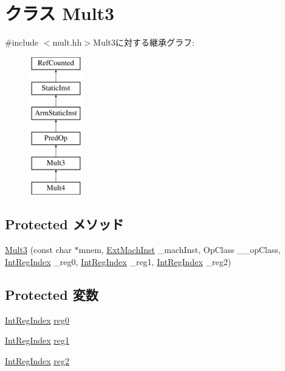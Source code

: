\hypertarget{classArmISA_1_1Mult3}{
\section{クラス Mult3}
\label{classArmISA_1_1Mult3}
}


{\ttfamily \#include $<$mult.hh$>$}Mult3に対する継承グラフ:\begin{figure}[H]
\begin{center}
\leavevmode
\includegraphics[height=6cm]{classArmISA_1_1Mult3}
\end{center}
\end{figure}
\subsection*{Protected メソッド}
\begin{DoxyCompactItemize}
\item 
\hyperlink{classArmISA_1_1Mult3_aca7558e284e8d9be43dd576b00d43e36}{Mult3} (const char $\ast$mnem, \hyperlink{classStaticInst_a5605d4fc727eae9e595325c90c0ec108}{ExtMachInst} \_\-machInst, OpClass \_\-\_\-opClass, \hyperlink{namespaceArmISA_ae64680ba9fb526106829d6bf92fc791b}{IntRegIndex} \_\-reg0, \hyperlink{namespaceArmISA_ae64680ba9fb526106829d6bf92fc791b}{IntRegIndex} \_\-reg1, \hyperlink{namespaceArmISA_ae64680ba9fb526106829d6bf92fc791b}{IntRegIndex} \_\-reg2)
\end{DoxyCompactItemize}
\subsection*{Protected 変数}
\begin{DoxyCompactItemize}
\item 
\hyperlink{namespaceArmISA_ae64680ba9fb526106829d6bf92fc791b}{IntRegIndex} \hyperlink{classArmISA_1_1Mult3_aa6e6898ab26fd030ad0d0782b6a48a3c}{reg0}
\item 
\hyperlink{namespaceArmISA_ae64680ba9fb526106829d6bf92fc791b}{IntRegIndex} \hyperlink{classArmISA_1_1Mult3_a3c9e30fb19ad22fe7061b3aec6c3eeea}{reg1}
\item 
\hyperlink{namespaceArmISA_ae64680ba9fb526106829d6bf92fc791b}{IntRegIndex} \hyperlink{classArmISA_1_1Mult3_a0d7ce7c65782c859c4233d55f6424a2e}{reg2}
\end{DoxyCompactItemize}


